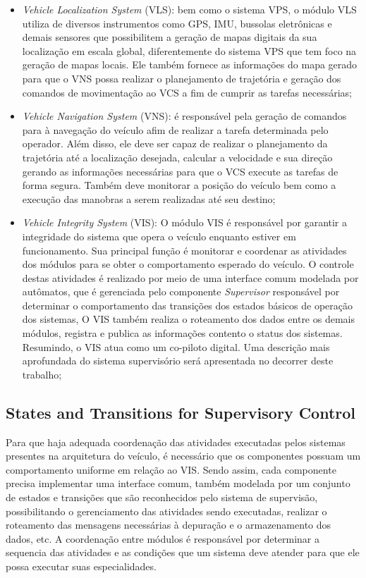 \documentclass[conference]{IEEEtran}
\begin{document}
\begin{itemize}
	\item \textit{Vehicle Localization System} (VLS): bem como o sistema VPS, o módulo VLS utiliza de diversos instrumentos como GPS, IMU, bussolas eletrônicas e demais sensores que possibilitem a geração de mapas digitais da sua localização em escala global, diferentemente do sistema VPS que tem foco na geração de mapas locais. Ele também fornece as informações do mapa gerado para que o VNS possa realizar o planejamento de trajetória e geração dos comandos de movimentação ao VCS a fim de cumprir as tarefas necessárias;
	
	\item \textit{Vehicle Navigation System} (VNS): é responsável pela geração de comandos para à navegação do veículo afim de realizar a tarefa determinada pelo operador. Além disso, ele deve ser capaz de realizar o planejamento da trajetória até a localização desejada, calcular a velocidade e sua direção gerando as informações necessárias para que o VCS execute as tarefas de forma segura. Também deve	monitorar a posição do veículo bem como a execução das manobras a serem realizadas até seu destino;
	
	\item \textit{Vehicle Integrity System} (VIS): O módulo VIS é responsável por garantir a integridade do sistema que opera o veículo enquanto estiver em funcionamento. Sua principal função é monitorar e coordenar as atividades dos módulos para se obter o comportamento esperado do veículo. O controle destas atividades é realizado por meio de uma interface comum modelada por autômatos, que é gerenciada pelo componente \textit{Supervisor} responsável por determinar o comportamento das transições dos estados básicos de operação dos sistemas, O VIS também realiza o roteamento dos dados entre os demais módulos, registra e publica as informações contento o status dos sistemas. Resumindo, o VIS atua como um co-piloto digital. Uma descrição mais aprofundada do sistema supervisório será apresentada no decorrer deste trabalho;
\end{itemize}
%
\subsection{States and Transitions for Supervisory Control}\label{subsec:states_transitions}

Para que haja adequada coordenação das atividades executadas pelos sistemas presentes na arquitetura do veículo, é necessário que os componentes possuam um comportamento uniforme em relação ao VIS. Sendo assim, cada componente precisa implementar uma interface comum, também modelada por um conjunto de estados e transições que são reconhecidos pelo sistema de supervisão, possibilitando o gerenciamento das atividades sendo executadas, realizar o roteamento das mensagens necessárias à depuração e o armazenamento dos dados, etc. A coordenação entre módulos é responsável por determinar a sequencia das atividades e as condições que um sistema deve atender para que ele possa executar suas especialidades.
\end{document}

